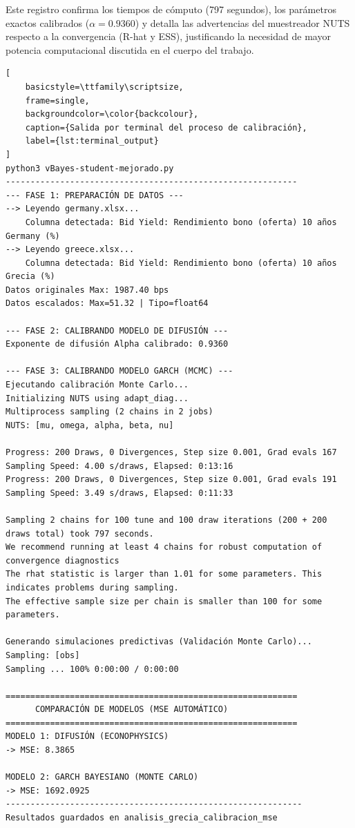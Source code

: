 Este registro confirma los tiempos de cómputo (797 segundos), los parámetros exactos calibrados ($\alpha=0.9360$) y detalla las advertencias del muestreador NUTS respecto a la convergencia (R-hat y ESS), justificando la necesidad de mayor potencia computacional discutida en el cuerpo del trabajo.

\begin{lstlisting}[
    basicstyle=\ttfamily\scriptsize, 
    frame=single, 
    backgroundcolor=\color{backcolour}, 
    caption={Salida por terminal del proceso de calibración},
    label={lst:terminal_output}
]
python3 vBayes-student-mejorado.py
-----------------------------------------------------------
--- FASE 1: PREPARACIÓN DE DATOS ---
--> Leyendo germany.xlsx...
    Columna detectada: Bid Yield: Rendimiento bono (oferta) 10 años Germany (%)
--> Leyendo greece.xlsx...
    Columna detectada: Bid Yield: Rendimiento bono (oferta) 10 años Grecia (%)
Datos originales Max: 1987.40 bps
Datos escalados: Max=51.32 | Tipo=float64

--- FASE 2: CALIBRANDO MODELO DE DIFUSIÓN ---
Exponente de difusión Alpha calibrado: 0.9360

--- FASE 3: CALIBRANDO MODELO GARCH (MCMC) ---
Ejecutando calibración Monte Carlo...
Initializing NUTS using adapt_diag...
Multiprocess sampling (2 chains in 2 jobs)
NUTS: [mu, omega, alpha, beta, nu]

Progress: 200 Draws, 0 Divergences, Step size 0.001, Grad evals 167
Sampling Speed: 4.00 s/draws, Elapsed: 0:13:16
Progress: 200 Draws, 0 Divergences, Step size 0.001, Grad evals 191
Sampling Speed: 3.49 s/draws, Elapsed: 0:11:33

Sampling 2 chains for 100 tune and 100 draw iterations (200 + 200 draws total) took 797 seconds.
We recommend running at least 4 chains for robust computation of convergence diagnostics
The rhat statistic is larger than 1.01 for some parameters. This indicates problems during sampling.
The effective sample size per chain is smaller than 100 for some parameters.

Generando simulaciones predictivas (Validación Monte Carlo)...
Sampling: [obs]
Sampling ... 100% 0:00:00 / 0:00:00

===========================================================
      COMPARACIÓN DE MODELOS (MSE AUTOMÁTICO)
===========================================================
MODELO 1: DIFUSIÓN (ECONOPHYSICS)
-> MSE: 8.3865

MODELO 2: GARCH BAYESIANO (MONTE CARLO)
-> MSE: 1692.0925
------------------------------------------------------------
Resultados guardados en analisis_grecia_calibracion_mse
\end{lstlisting}